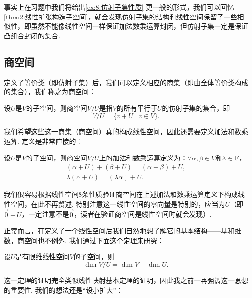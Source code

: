 事实上在习题中我们将给出\autoref*{ex:8:仿射子集性质} 更一般的形式，我们可以回忆\autoref{thm:2:线性扩张构造子空间}，就会发现仿射子集的结构和线性空间保留了一些相似性，即虽然不能像线性空间一样保证加法数乘运算封闭，但仿射子集一定是保证凸组合封闭的集合.

\subsection{商空间}

定义了等价类（即仿射子集）后，我们可以定义相应的商集（即由全体等价类构成的集合），我们称之为商空间：
\begin{definition}
    设$U$是$V$的子空间，则商空间$V/U$是指$V$的所有平行于$U$的仿射子集的集合，即
    \[V/U=\{v+U \mid v\in V\}.\]
\end{definition}
我们希望这些这一商集（商空间）真的构成线性空间，因此还需要定义加法和数乘运算. 定义是非常直接的：
\begin{definition}
    设$U$是$V$的子空间，则商空间$V/U$上的加法和数乘运算定义为：$\forall \alpha,\beta\in V$和$\lambda\in\mathbf{F}$，
    \begin{gather*}
        (\alpha+U)+(\beta+U)=(\alpha+\beta)+U, \\
        \lambda(\alpha+U)=(\lambda\alpha)+U.
    \end{gather*}
\end{definition}
我们很容易根据线性空间8条性质验证商空间在上述加法和数乘运算定义下构成线性空间，在此不再赘述. 特别注意这一线性空间的零向量是特别的，应当为$U$（即$\vec{0}+U$，一定注意不是$\vec{0}$，读者在验证商空间是线性空间时就会发现）.

正常而言，在定义了一个线性空间后我们自然地想了解它的基本结构——基和维数，商空间也不例外. 我们通过下面这个定理来研究：
\begin{theorem}\label{thm:8:商空间维数}
    设$U$是有限维线性空间$V$的子空间，则
    \[\dim V/U=\dim V-\dim U.\]
\end{theorem}
这一定理的证明完全类似线性映射基本定理的证明，因此我之前一再强调这一思想的重要性. 我们的想法还是``设小扩大''：


